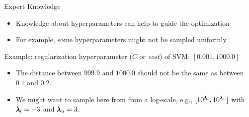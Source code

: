 
\subtitle{Example and Practical Hints}





\maketitle



\begin{frame}{Expert Knowledge}

\begin{itemize}
	\item Knowledge about hyperparameters can help to guide the optimization
	\item For example, some hyperparameters might not be sampled uniformly
\end{itemize}

    \vspace{0.5cm}
Example: regularization hyperparameter ($C$ or \emph{cost}) of SVM: $[0.001, 1000.0]$

\begin{itemize}
	\item The distance between $999.9$ and $1000.0$ should not be the same as between $0.1$ and $0.2$.
  \item We might want to sample here from from a log-scale, e.g., $[10^{\pmb{\lambda}_l}, 10^{\pmb{\lambda}_u}]$ with $\pmb{\lambda}_l = -3$ and $\pmb{\lambda}_u = 3$.
\end{itemize}

\begin{figure}[htb]
\centering
\end{figure}


\end{frame}

